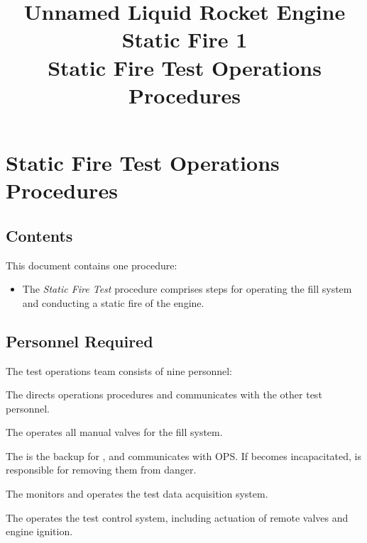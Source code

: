

\title{
\Huge Unnamed Liquid Rocket Engine\\
Static Fire 1\\
\vspace{1cm}
\Large Static Fire Test Operations Procedures}





\section{Static Fire Test Operations Procedures}

\subsection{Contents}
This document contains one procedure:
\begin{itemize}
    \item The \textit{Static Fire Test} procedure comprises steps for operating the fill system and conducting a static fire of the engine.
\end{itemize}

\subsection{Personnel Required}
The test operations team consists of nine personnel:
\begin{checklist}
    \item The \opsfull{} directs operations procedures and communicates with the other test personnel.
    \item The \primaryfull{} operates all manual valves for the fill system.
    \item The \secondaryfull{} is the backup for \primary{}, and communicates with OPS. If \primary{} becomes incapacitated, \secondary{} is responsible for removing them from danger.
    \item The \daqfull{} monitors and operates the test data acquisition system.
    \item The \controlfull{} operates the test control system, including actuation of remote valves and engine ignition.
\end{checklist}
\setcounter{checklistnum}{0}


